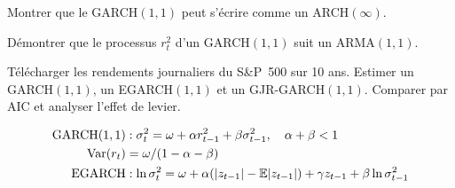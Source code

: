 \begin{exercice}[$\star\star$]
Montrer que le GARCH$(1,1)$ peut s'\'ecrire comme un ARCH$(\infty)$.
\end{exercice}

\begin{exercice}[$\star\star$]
D\'emontrer que le processus $r_t^2$ d'un GARCH$(1,1)$ suit un ARMA$(1,1)$.
\end{exercice}

\begin{exercice}
T\'el\'echarger les rendements journaliers du S\&P~500 sur 10 ans. Estimer un GARCH$(1,1)$, un EGARCH$(1,1)$ et un GJR-GARCH$(1,1)$. Comparer par AIC et analyser l'effet de levier.
\end{exercice}

\begin{formules}
\begin{align*}
\text{GARCH}(1,1) &: \sigma_t^2 = \omega+\alpha r_{t-1}^2+\beta\sigma_{t-1}^2, \quad \alpha+\beta<1 \\
\operatorname{Var}(r_t) &= \omega/(1-\alpha-\beta) \\
\text{EGARCH} &: \ln\sigma_t^2 = \omega+\alpha(|z_{t-1}|-\mathbb{E}|z_{t-1}|)+\gamma z_{t-1}+\beta\ln\sigma_{t-1}^2
\end{align*}
\end{formules}
